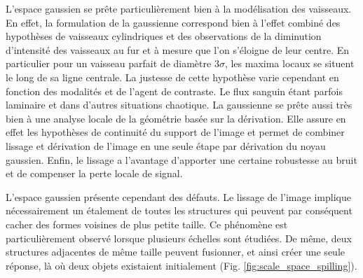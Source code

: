   L'espace gaussien se prête particulièrement bien à la modélisation des vaisseaux. En effet, la formulation de la gaussienne correspond bien à l'effet combiné des hypothèses de vaisseaux cylindriques et des observations de la diminution d'intensité des vaisseaux au fur et à mesure que l'on s'éloigne de leur centre. En particulier pour un vaisseau parfait de diamètre $3\sigma$, les maxima locaux se situent le long de sa ligne centrale. La justesse de cette hypothèse varie cependant en fonction des modalités et de l'agent de contraste. Le flux sanguin étant parfois laminaire et dans d'autres situations chaotique. La gaussienne se prête aussi très bien à une analyse locale de la géométrie basée sur la dérivation. Elle assure en effet les hypothèses de continuité du support de l'image et permet de combiner lissage et dérivation de l'image en une seule étape par dérivation du noyau gaussien. Enfin, le lissage a l'avantage d'apporter une certaine robustesse au bruit et de compenser la perte locale de signal.

  L'espace gaussien présente cependant des défauts. Le lissage de l'image implique nécessairement un étalement de toutes les structures qui peuvent par conséquent cacher des formes voisines de plus petite taille. Ce phénomène est particulièrement observé lorsque plusieurs échelles sont étudiées. De même, deux structures adjacentes de même taille peuvent fusionner, et ainsi créer une seule réponse, là où deux objets existaient initialement (Fig. \ref{fig:scale_space_spilling}).
  
